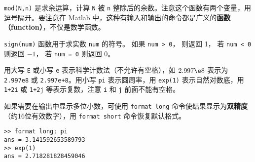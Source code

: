 \verb|mod(N,n)| 是求余运算，计算 \verb|N| 被 \verb|n| 整除后的余数。注意这个函数有两个变量，用逗号隔开。要注意在 Matlab 中，这种有输入和输出的命令都是广义的\textbf{函数（function）}，不仅是数学函数。

\verb|sign(num)| 函数用于求实数 \verb|num| 的符号。 如果 \verb|num > 0|， 则返回 1， 若 \verb|num < 0| 则返回 $-1$， 若 \verb|num = 0| 则返回 0。

用大写 \verb|E| 或小写 \verb|e| 表示科学计数法（不允许有空格），如 $2.997\e8$ 表示为 \verb|2.997e8| 或 \verb|2.997e+8|。用小写 \verb|pi| 表示圆周率，用 \verb|exp(1)| 表示自然对数底，用 \verb|1+2i| 或 \verb|1+2j| 等表示复数，注意 \verb|i| 和 \verb|j| 前面不能有空格。

如果需要在输出中显示多位小数，可使用 \verb|format long| 命令使结果显示为\textbf{双精度}（约16位有效数字），用 \verb|format short| 命令恢复默认格式。
\begin{lstlisting}[language=matlabC]
>> format long; pi
ans = 3.141592653589793
>> exp(1)
ans = 2.718281828459046
\end{lstlisting}
